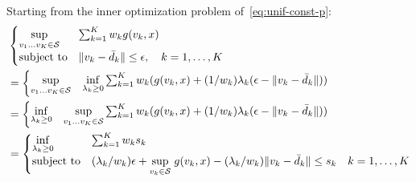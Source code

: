 \documentclass[12pt]{article}
\theoremstyle{thmstyleone}%
\theoremstyle{thmstyletwo}%
\theoremstyle{thmstylethree}%
\begin{document}
\begin{appendices}
Starting from the inner optimization problem of~\eqref{eq:unif-const-p}:
\begin{equation*}
	\begin{aligned}
& \begin{cases}
	\underset{v_1 \dots v_K \in \supp}{\sup} &\sum_{k=1} ^K w_k g(v_k, x) \\
	\mbox{subject to} &  \|v_k - \bar{d}_k\| \le \epsilon, \quad k = 1,\dots,K
\end{cases}\\
&= \begin{cases}
	\underset{v_1 \dots v_K\in \supp}{\sup}  & \underset{\lambda_k \geq 0}{\inf}   \sum_{k=1} ^K  w_k (g(v_k, x)  +  (1/w_k)\lambda_k (\epsilon  - \|v_k - \bar{d}_k\| ))\\
	\end{cases}\\
	&= \begin{cases}
		\underset{\lambda_k \geq 0}{\inf} & \underset{v_1 \dots v_K\in \supp}{\sup}    \sum_{k=1} ^K  w_k  (g(v_k, x)  +  (1/w_k)\lambda_k (\epsilon  - \|v_k - \bar{d}_k\| ))\\
		\end{cases}\\
&= \begin{cases}
	\underset{\lambda_k \geq 0}{\inf} &  \sum_{k=1} ^K  w_k s_k \\
	\mbox{subject to} &   (\lambda_k/w_k)\epsilon + \underset{v_k\in \supp}{\sup}\hspace{1mm} g(v_k, x) -(\lambda_k/w_k)\|v_k - \bar{d}_k\| \le s_k \quad k = 1,\dots,K
\end{cases}\\

\end{aligned}
\end{equation*}
\end{appendices}
\end{document}
